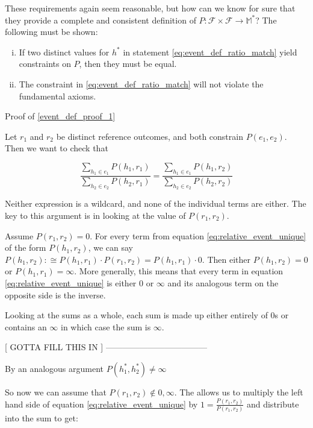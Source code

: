 \documentclass[twoside]{article}
\theoremstyle{plain}%
\theoremstyle{definition}
\theoremstyle{remark}
\begin{document}
These requirements again seem reasonable, but how can we know for sure that they provide a complete and consistent definition of \(P: \mathcal{F} \times \mathcal{F} \rightarrow \mathbb{M}^*\)? The following must be shown:

\begin{enumerate}[(i)]
  \item \label{event_def_proof_1} If two distinct values for \(h^*\) in statement \ref{eq:event_def_ratio_match} yield constraints on \(P\), then they must be equal.
  \item \label{event_def_proof_2} The constraint in \ref{eq:event_def_ratio_match} will not violate the fundamental axioms.
\end{enumerate}

Proof of \ref{event_def_proof_1}

Let \(r_1\) and \(r_2\) be distinct reference outcomes, and both constrain \(P(e_1, e_2)\). Then we want to check that

\begin{equation}
\label{eq:relative_event_unique}
\frac{\sum_{h_1 \in e_1} P(h_1, r_1)}{\sum_{h_2 \in e_2} P(h_2, r_1)} = \frac{\sum_{h_1 \in e_1} P(h_1, r_2)}{\sum_{h_2 \in e_2} P(h_2, r_2)}
\end{equation}

Neither expression is a wildcard, and none of the individual terms are either. The key to this argument is in looking at the value of \(P(r_1, r_2)\).

Assume \(P(r_1, r_2) = 0\). For every term from equation \ref{eq:relative_event_unique} of the form \(P(h_1, r_2)\), we can say \(P(h_1, r_2):\cong P(h_1, r_1) \cdot P(r_1, r_2) = P(h_1, r_1) \cdot 0\). Then either \(P(h_1, r_2) = 0\) or \(P(h_1, r_1) = \infty\). More generally, this means that every term in equation \ref{eq:relative_event_unique} is either \(0\) or \(\infty\) and its analogous term on the opposite side is the inverse.

Looking at the sums as a whole, each sum is made up either entirely of 0s or contains an \(\infty\) in which case the sum is \(\infty\).

[ GOTTA FILL THIS IN ]
------------------------------------

By an analogous argument  \(P(h_1^*, h_2^*) \neq \infty\)

So now we can assume that \(P(r_1, r_2) \notin {0, \infty} \). The allows us to multiply the left hand side of equation \ref{eq:relative_event_unique} by \(1 = \frac{P(r_1, r_2)}{P(r_1, r_2)}\) and distribute into the sum to get:
\end{document}
